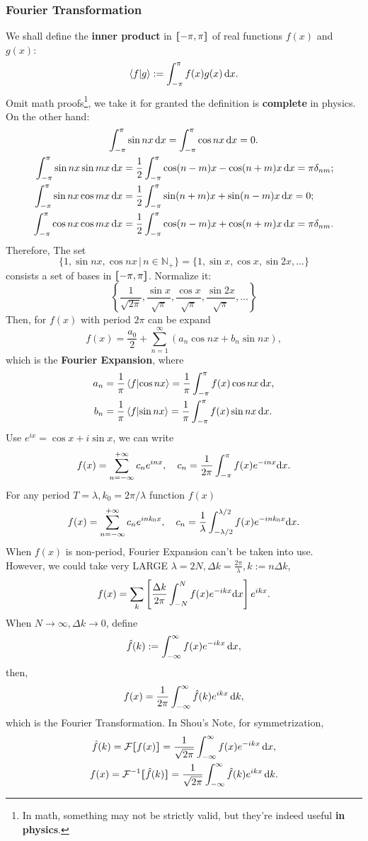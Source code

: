 \documentclass{article}
\def\d{{\rm d}}
\def\id{\,\d}%
\newcommand{\ko}[1]{\hspace{-#1 pt}}%
\newcommand{\brkt}[2]{\left\langle #1\middle\vert#2\right\rangle}
\newcommand{\kh}[1]{\left(#1\right)}
\newcommand{\cmm}[1]{\lfloor\ko{4.45}\lceil #1\rceil\ko{4.45}\rfloor}%
\begin{document}
\subsubsection{Fourier Transformation}
We shall define the \textbf{inner product} in $\cmm{-\pi,\pi}$ of real functions $f(x)$ and $g(x)$:
$$\brkt fg:=\int_{-\pi}^\pi f(x)g(x)\id x.$$
Omit math proofs\footnote{In math, something may not be strictly valid, but they're indeed useful \textbf{in physics}.}, we take it for granted the definition is \textbf{complete} in physics.\\
On the other hand:
\begin{gather*}
	\int_{-\pi}^\pi\sin nx\id x=\int_{-\pi}^\pi\cos nx\id x=0.\\
	\begin{aligned}
		\int_{-\pi}^\pi\sin nx\sin mx\id x & =\frac12\int_{-\pi}^\pi\cos(n-m)x-\cos(n+m)x\id x=\pi\delta_{nm}; \\
		\int_{-\pi}^\pi\sin nx\cos mx\id x & =\frac12\int_{-\pi}^\pi\sin(n+m)x+\sin(n-m)x\id x=0;              \\
		\int_{-\pi}^\pi\cos nx\cos mx\id x & =\frac12\int_{-\pi}^\pi\cos(n-m)x+\cos(n+m)x\id x=\pi\delta_{nm}.
	\end{aligned}
\end{gather*}
Therefore, The set
$$\{1,\sin nx,\cos nx\,|\,n\in\mathbb N_+\}=\{1,\sin x,\cos x,\sin2x,\ldots\}$$
consists a set of bases in $\cmm{-\pi,\pi}$. Normalize it:
$$\left\{\frac1{\sqrt{2\pi}},\frac{\sin x}{\sqrt\pi},\frac{\cos x}{\sqrt\pi},\frac{\sin2x}{\sqrt\pi},\ldots\right\}$$
Then, for $f(x)$ with period $2\pi$ can be expand
$$f(x)=\frac{a_0}2+\sum_{n=1}^\infty\kh{a_n\cos nx+b_n\sin nx},$$
which is the \textbf{Fourier Expansion}, where
\begin{align*}
	a_n & =\frac1\pi\brkt f{\cos nx}=\frac1\pi\int_{-\pi}^\pi f(x)\cos nx\id x, \\
	b_n & =\frac1\pi\brkt f{\sin nx}=\frac1\pi\int_{-\pi}^\pi f(x)\sin nx\id x.
\end{align*}
Use $e^{ix}=\cos x+i\sin x$, we can write
$$f(x)=\sum_{n=-\infty}^{+\infty}c_ne^{inx},\quad c_n=\frac1{2\pi}\int_{-\pi}^\pi f(x)e^{-inx}\d x.$$
For any period $T=\lambda, k_0=2\pi/\lambda$ function $f(x)$
$$f(x)=\sum_{n=-\infty}^{+\infty}c_ne^{ink_0x},\quad c_n=\frac1\lambda\int_{-\lambda/2}^{\lambda/2} f(x)e^{-ink_0x}\d x.$$
When $f(x)$ is non-period, Fourier Expansion can't be taken into use.\\
However, we could take very LARGE $\lambda=2N,\Delta k=\frac{2\pi}\lambda,k:=n\Delta k$,
$$f(x)=\sum_k\left[\frac{\Delta k}{2\pi}\int_{-N}^Nf(x)e^{-ikx}\d x\right]e^{ikx}.$$
When $N\to\infty,\Delta k\to0$, define
$$\hat f(k):=\int_{-\infty}^\infty f(x)e^{-ikx}\id x,$$
then,
$$f(x)=\frac1{2\pi}\int_{-\infty}^\infty\hat f(k)e^{ikx}\id k,$$
which is the Fourier Transformation. In Shou's Note, for symmetrization,
\begin{gather*}
	\hat f(k)=\mathcal F\cmm{f(x)}=\frac1{\sqrt{2\pi}}\int_{-\infty}^\infty f(x)e^{-ikx}\id x,\\
	f(x)=\mathcal F^{-1}\cmm{\hat f(k)}=\frac1{\sqrt{2\pi}}\int_{-\infty}^\infty \hat f(k)e^{ikx}\id k.
\end{gather*}
\end{document}
